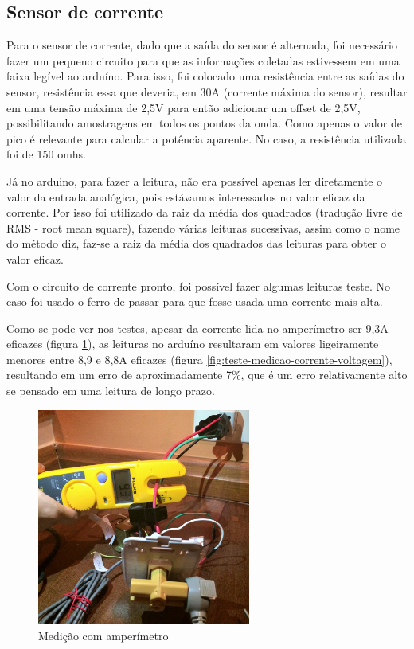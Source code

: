 \subsection{Sensor de corrente}

Para o sensor de corrente, dado que a saída do sensor é alternada, foi necessário fazer um pequeno circuito para que as informações coletadas estivessem em uma faixa legível ao arduíno. Para isso, foi colocado uma resistência entre as saídas do sensor, resistência essa que deveria, em 30A (corrente máxima do sensor), resultar em uma tensão máxima de 2,5V para então adicionar um offset de 2,5V, possibilitando amostragens em todos os pontos da onda. Como apenas o valor de pico é relevante para calcular a potência aparente.
No caso, a resistência utilizada foi de 150 omhs. 

Já no arduino, para fazer a leitura, não era possível apenas ler diretamente o valor da entrada analógica, pois estávamos interessados no valor eficaz da corrente. Por isso foi utilizado da raiz da média dos quadrados (tradução livre de RMS - root mean square), fazendo várias leituras sucessivas, assim como o nome do método diz, faz-se a raiz da média dos quadrados das leituras para obter o valor eficaz.

Com o circuito de corrente pronto, foi possível fazer algumas leituras teste. No caso foi usado o ferro de passar para que fosse usada uma corrente mais alta. 

Como se pode ver nos testes, apesar da corrente lida no amperímetro ser 9,3A eficazes (figura \ref{fig:teste-amperimetro}), as leituras no arduíno resultaram em valores ligeiramente menores entre 8,9 e 8,8A eficazes (figura \ref{fig:teste-medicao-corrente-voltagem}), resultando em um erro de aproximadamente 7\%, que é um erro relativamente alto se pensado em uma leitura de longo prazo.

\begin{figure}[H]
\centering
\includegraphics[width=7cm,keepaspectratio]{figuras/ferro-passar-amp.jpg} 
\caption{\label{fig:teste-amperimetro} Medição com amperímetro}
\end{figure}

